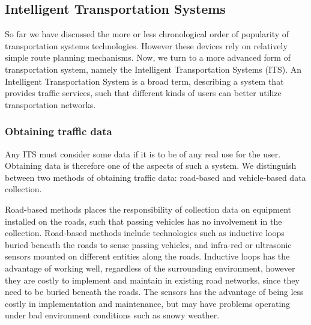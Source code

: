 \subsection*{Intelligent Transportation Systems}
So far we have discussed the more or less chronological order of popularity of transportation systems technologies. However these devices rely on relatively simple route planning mechanisms. Now, we turn to a more advanced form of transportation system, namely the Intelligent Transportation Systems (ITS). An Intelligent Transportation System is a broad term, describing a system that provides traffic services, such that different kinds of users can better utilize transportation networks. %

\subsubsection*{Obtaining traffic data}
Any ITS must consider some data if it is to be of any real use for the user. Obtaining data is therefore one of the aspects of such a system. We distinguish between two methods of obtaining traffic data: road-based and vehicle-based data collection. 

Road-based methods places the responsibility of collection data on equipment installed on the roads, such that passing vehicles has no involvement in the collection. Road-based methods\cite{PIARC0} include technologies such as inductive loops buried beneath the roads to sense passing vehicles, and infra-red or ultrasonic sensors mounted on different entities along the roads. Inductive loops has the advantage of working well, regardless of the surrounding environment, however they are costly to implement and maintain in existing road networks, since they need to be buried beneath the roads. The sensors has the advantage of being less costly in implementation and maintenance, but may have problems operating under bad environment conditions such as snowy weather\cite{KamranHaas2007,PIARC0}.

